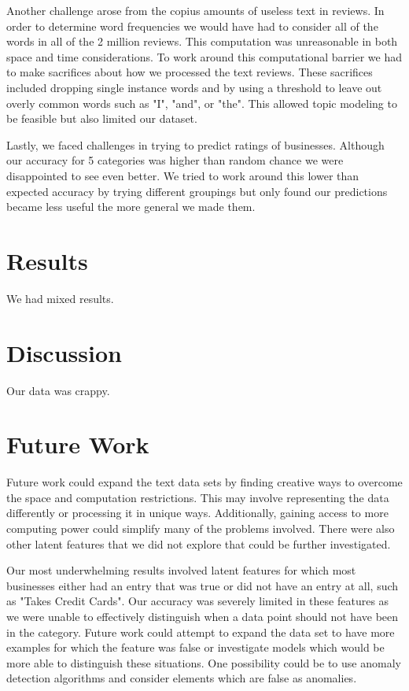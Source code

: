 \documentclass{article}
\begin{document}
Another challenge arose from the copius amounts of useless text in reviews.  In order to determine word frequencies we would have had to consider all of the words in all of the 2 million reviews.  This computation was unreasonable in both space and time considerations.  To work around this computational barrier we had to make sacrifices about how we processed the text reviews.  These sacrifices included dropping single instance words and by using a threshold to leave out overly common words such as "I", "and", or "the".  This allowed topic modeling to be feasible but also limited our dataset.

Lastly, we faced challenges in trying to predict ratings of businesses.  Although our accuracy for 5 categories was higher than random chance we were disappointed to see even better.  We tried to work around this lower than expected accuracy by trying different groupings but only found our predictions became less useful the more general we made them.

\section{Results}

We had mixed results.

\section{Discussion}

Our data was crappy.

\section{Future Work}

Future work could expand the text data sets by finding creative ways to overcome the space and computation restrictions.  This may involve representing the data differently or processing it in unique ways.  Additionally, gaining access to more computing power could simplify many of the problems involved.  There were also other latent features that we did not explore that could be further investigated.

Our most underwhelming results involved latent features for which most businesses either had an entry that was true or did not have an entry at all, such as "Takes Credit Cards".  Our accuracy was severely limited in these features as we were unable to effectively distinguish when a data point should not have been in the category.  Future work could attempt to expand the data set to have more examples for which the feature was false or investigate models which would be more able to distinguish these situations.  One possibility could be to use anomaly detection algorithms and consider elements which are false as anomalies.
\end{document}
